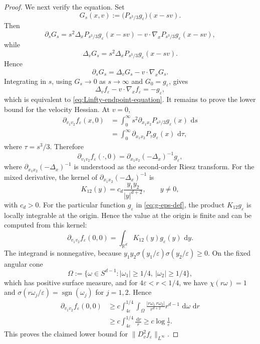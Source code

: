 \documentclass[10pt,a4paper]{amsart}
\numberwithin{equation}{section}
\newcommand{\R}{\mathbb{R}}
\newcommand{\dd}{\,\mathrm{d}}
\begin{document}
\begin{proof}
We next verify the equation.  Set
\[
   G_s(x,v):=\big(P_{s^3/3}g_\varepsilon\big)(x-sv).
\]
Then
\[
   \partial_sG_s
   =s^2\Delta_x P_{s^3/3}g_\varepsilon(x-sv)
    -v\cdot\nabla_x P_{s^3/3}g_\varepsilon(x-sv),
\]
while
\[
   \Delta_vG_s
   =s^2\Delta_x P_{s^3/3}g_\varepsilon(x-sv).
\]
Hence
\[
   \partial_sG_s=\Delta_vG_s-v\cdot\nabla_xG_s.
\]
Integrating in \(s\), using \(G_s\to0\) as \(s\to\infty\) and
\(G_0=g_\varepsilon\), gives
\[
   \Delta_vf_\varepsilon-v\cdot\nabla_xf_\varepsilon=-g_\varepsilon,
\]
which is equivalent to \eqref{eq:Linfty-endpoint-equation}. It remains to prove the lower bound for the velocity Hessian.  At \(v=0\),
\[
\begin{aligned}
   \partial_{v_1v_2}f_\varepsilon(x,0)
   &=\int_0^\infty
      s^2\partial_{x_1x_2}P_{s^3/3}g_\varepsilon(x)\,\dd s  \\
   &=\int_0^\infty
      \partial_{x_1x_2}P_\tau g_\varepsilon(x)\,\dd\tau,
\end{aligned}
\]
where \(\tau=s^3/3\).  Therefore
\begin{equation}\label{eq:riesz-identity}
   \partial_{v_1v_2}f_\varepsilon(\cdot,0)
   =\partial_{x_1x_2}(-\Delta_x)^{-1}g_\varepsilon,
\end{equation}
where \(\partial_{x_1x_2}(-\Delta_x)^{-1}\) is understood as the
second-order Riesz transform.  For the mixed derivative, the kernel of
\(\partial_{x_1x_2}(-\Delta_x)^{-1}\) is
\begin{equation}\label{eq:riesz-kernel}
   K_{12}(y)=c_d\frac{y_1y_2}{|y|^{d+2}},
   \qquad y\ne0,
\end{equation}
with \(c_d>0\).  For the particular function \(g_\varepsilon\) in
\eqref{eq:g-eps-def}, the product \(K_{12}g_\varepsilon\) is locally
integrable at the origin.  Hence the value at the origin is finite and
can be computed from this kernel:
\[
   \partial_{v_1v_2}f_\varepsilon(0,0)
   =\int_{\R^d}K_{12}(y)g_\varepsilon(y)\,\dd y.
\]
The integrand is nonnegative, because
\(y_1y_2\sigma(y_1/\varepsilon)\sigma(y_2/\varepsilon)\ge0\).  On the fixed
angular cone
\[
   \Omega:=\{\omega\in S^{d-1}: |\omega_1|\ge1/4,\ |\omega_2|\ge1/4\},
\]
which has positive surface measure, and for
\(4\varepsilon<r<1/4\), we have \(\chi(r\omega)=1\) and
\(\sigma(r\omega_j/\varepsilon)=\operatorname{sgn}(\omega_j)\) for
\(j=1,2\).  Hence
\[
\begin{aligned}
   \partial_{v_1v_2}f_\varepsilon(0,0)
   &\ge
   c\int_{4\varepsilon}^{1/4}\int_{\Omega}
      \frac{|r\omega_1\,r\omega_2|}{r^{d+2}}
      r^{d-1}\,\dd\omega\,\dd r  \\
   &\ge c\int_{4\varepsilon}^{1/4}\frac{\dd r}{r}
    \ge c\log\frac1\varepsilon.
\end{aligned}
\]
This proves the claimed lower bound for \(\|D_v^2f_\varepsilon\|_{L^\infty}\).
\end{proof}
\end{document}
